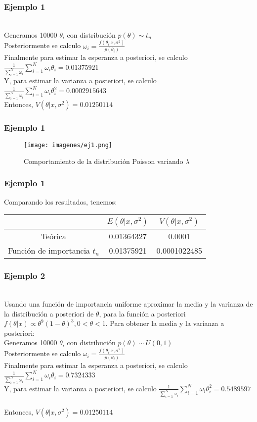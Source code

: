\documentclass[12pt]{beamer}
\begin{document}
\begin{frame}
\frametitle{Ejemplo 1}
~\\Generamos 10000 $\theta_{i}$ con distribución $p(\theta)\sim t_{n}$
~\\Posteriormente se calculo $\omega_{i}=\frac{f(\theta_{i}|x,\sigma^2)}{p(\theta_{i})}$
~\\Finalmente para estimar la esperanza a posteriori, se calculo $\frac{1}{\sum\limits_{i=1}^{N}\omega_{i}}\sum\limits_{i=1}^{N}\omega_{i}\theta_{i}=0.01375921$
~\\Y, para estimar la varianza a posteriori, se calculo $\frac{1}{\sum\limits_{i=1}^{N}\omega_{i}}\sum\limits_{i=1}^{N}\omega_{i}\theta_{i}^2=0.0002915643$
~\\Entonces, $V(\theta|x,\sigma^2)=0.01250114$
\end{frame}

\begin{frame}
\frametitle{Ejemplo 1}
\begin{figure}[!h]
    \begin{center}
        \texttt{[image: imagenes/ej1.png]}
        \caption{Comportamiento de la distribución Poisson variando $\lambda$}
        \label{fig:Densidad}
    \end{center}
\end{figure}
\end{frame}

\begin{frame}
\frametitle{Ejemplo 1}
Comparando los resultados, tenemos:
\begin{tabular}{|c|c|c|}
\hline 
 & $E(\theta|x,\sigma^2)$ & $V(\theta|x,\sigma^2)$ \\ 
\hline 
Teórica & 0.01364327 & 0.0001 \\ 
Función de importancia $t_{n}$ &  0.01375921 & 0.0001022485 \\ 
\hline 
\end{tabular} 
\end{frame}

\begin{frame}
\frametitle{Ejemplo 2}
~\\ Usando una función de importancia uniforme aproximar la media y la varianza de la distribución a posteriori de $\theta$, para la función a posteriori $f(\theta|x)\propto \theta^9(1-\theta)^3, 0<\theta<1$. Para obtener la media y la varianza a posteriori:
~\\Generamos 10000 $\theta_{i}$ con distribución $p(\theta)\sim U(0,1)$
~\\Posteriormente se calculo $\omega_{i}=\frac{f(\theta_{i}|x,\sigma^2)}{p(\theta_{i})}$
~\\Finalmente para estimar la esperanza a posteriori, se calculo $\frac{1}{\sum\limits_{i=1}^{N}\omega_{i}}\sum\limits_{i=1}^{N}\omega_{i}\theta_{i}=0.7324333$
~\\Y, para estimar la varianza a posteriori, se calculo $\frac{1}{\sum\limits_{i=1}^{N}\omega_{i}}\sum\limits_{i=1}^{N}\omega_{i}\theta_{i}^2=0.5489597$
~\\Entonces, $V(\theta|x,\sigma^2)=0.01250114$
\end{frame}
\end{document}
